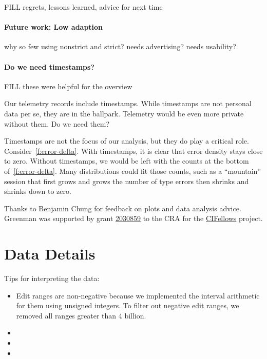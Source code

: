 \documentclass[english,submission,cleveref]{programming}
\begin{document}
FILL regrets, lessons learned, advice for next time

\paragraph{Future work: Low adaption}

why so few using nonstrict and strict?
needs advertising?
needs usability?


\paragraph{Do we need timestamps?}

FILL these were helpful for the overview

Our telemetry records include timestamps.
While timestamps are not personal data per se, they are in the ballpark.
Telemetry would be even more private without them.
Do we need them?

Timestamps are not the focus of our analysis, but they do play a critical role.
Consider~\cref{f:error-delta}.
With timestamps, it is clear that error density stays close to zero.
Without timestamps, we would be left with the counts at the bottom
of~\cref{f:error-delta}.
Many distributions could fit those counts, such as a ``mountain'' session that first
grows and grows the number of type errors then shrinks and shrinks down to zero.


\acks

Thanks to Benjamin Chung for feedback on plots and data analysis advice.
Greenman was supported by
grant \href{https://nsf.gov/awardsearch/showAward?AWD_ID=2030859&HistoricalAwards=false}{2030859}
to the CRA for the \href{https://cifellows2020.org}{CIFellows} project.

\newpage

\appendix

\section{Data Details}

Tips for interpreting the data:

\begin{itemize}
  \item
    Edit ranges are non-negative because we
    implemented the interval arithmetic for them using unsigned integers.
    To filter out negative edit ranges, we removed all ranges
    greater than 4 billion.

  \item
  \item
  \item
\end{itemize}

\newpage


\end{document}
